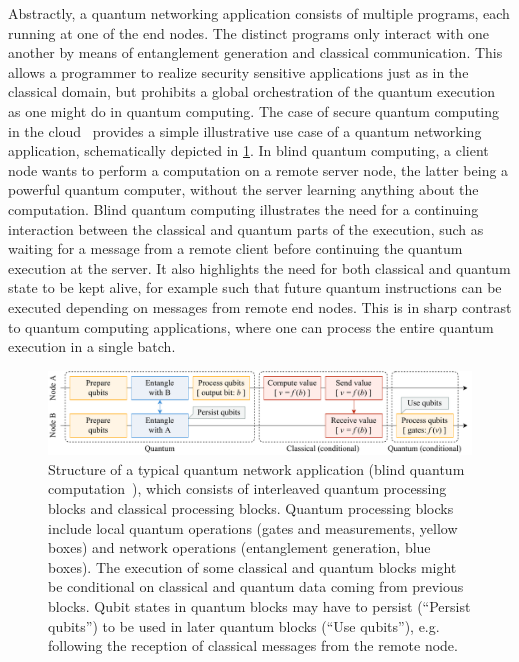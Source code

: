 Abstractly, a quantum networking application consists of multiple programs, each running at one of
the end nodes. The distinct programs only interact with one another by means of entanglement
generation and classical communication. This allows a programmer to realize security sensitive
applications just as in the classical domain, but prohibits a global orchestration of the quantum
execution as one might do in quantum computing. The case of secure quantum computing in the
cloud~\cite{broadbent_2009_ubqc, childs_2005_secure_qc} provides a simple illustrative use case of a
quantum networking application, schematically depicted in \cref{fig:app-struct}. In blind quantum
computing, a client node wants to perform a computation on a remote server node, the latter being a
powerful quantum computer, without the server learning anything about the computation. Blind quantum
computing illustrates the need for a continuing interaction between the classical and quantum parts
of the execution, such as waiting for a message from a remote client before continuing the quantum
execution at the server. It also highlights the need for both classical and quantum state to be kept
alive, for example such that future quantum instructions can be executed depending on messages from
remote end nodes. This is in sharp contrast to quantum computing applications, where one can process
the entire quantum execution in a single batch.

\begin{figure}
    \centering
    \includegraphics[width=\linewidth]{figures/app-struct.pdf}
    \caption{
        Structure of a typical quantum network application (blind quantum
        computation~\cite{broadbent_2009_ubqc, childs_2005_secure_qc}), which consists of interleaved
        quantum processing blocks and classical processing blocks. Quantum processing blocks include
        local quantum operations (gates and measurements, yellow boxes) and network operations
        (entanglement generation, blue boxes). The execution of some classical and quantum blocks might
        be conditional on classical and quantum data coming from previous blocks. Qubit states in
        quantum blocks may have to persist (``Persist qubits'') to be used in later quantum blocks
        (``Use qubits''), e.g. following the reception of classical messages from the remote node.
    }
    \label{fig:app-struct}
\end{figure}

